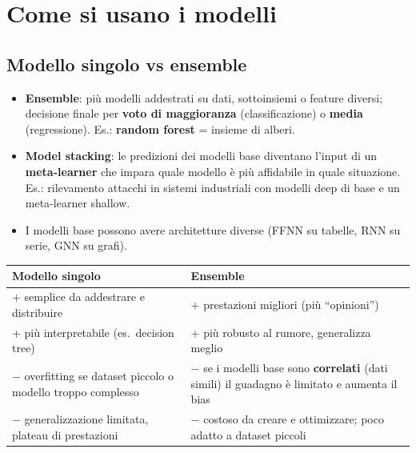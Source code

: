 \section{Come si usano i modelli}
\subsection{Modello singolo vs ensemble}
\begin{itemize}
  \item \textbf{Ensemble}: più modelli addestrati su dati, sottoinsiemi o feature diversi; decisione finale per
        \textbf{voto di maggioranza} (classificazione) o \textbf{media} (regressione). Es.: \textbf{random forest} = insieme di alberi.
  \item \textbf{Model stacking}: le predizioni dei modelli base diventano l'input di un \textbf{meta-learner} che impara
        quale modello è più affidabile in quale situazione. Es.: rilevamento attacchi in sistemi industriali con modelli
        deep di base e un meta-learner shallow.
  \item I modelli base possono avere architetture diverse (FFNN su tabelle, RNN su serie, GNN su grafi).
\end{itemize}
\begin{center}
\small
\begin{tabularx}{\textwidth}{X X}
\toprule
\textbf{Modello singolo} & \textbf{Ensemble}\\
\midrule
+ semplice da addestrare e distribuire & + prestazioni migliori (più ``opinioni'')\\
+ più interpretabile (es.\ decision tree) & + più robusto al rumore, generalizza meglio\\
$-$ overfitting se dataset piccolo o modello troppo complesso & $-$ se i modelli base sono \textbf{correlati} (dati simili) il guadagno è limitato e aumenta il bias\\
$-$ generalizzazione limitata, plateau di prestazioni & $-$ costoso da creare e ottimizzare; poco adatto a dataset piccoli\\
\bottomrule
\end{tabularx}
\end{center}

